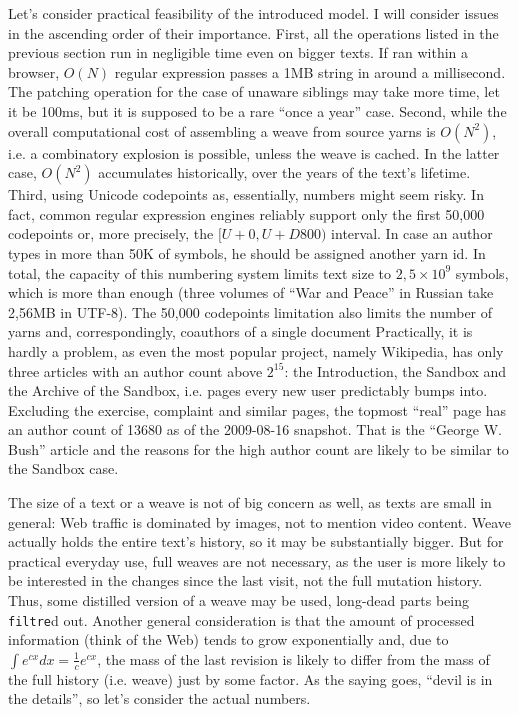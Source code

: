 \documentclass{acm_proc_article-sp}
\begin{document}
Let's consider practical feasibility of the introduced model.
I will consider issues in the ascending order of their
importance. First, all the operations
listed in the previous section run in negligible time
even on bigger texts. If ran within a browser, $O(N)$
regular expression passes a 1MB string in around a millisecond.
The patching operation for the case of unaware siblings may
take more time, let it be 100ms, but it is supposed to be a rare
``once a year'' case.
Second, while the overall computational cost of assembling a weave
from source yarns is $O(N^{2})$, i.e. a combinatory
explosion is possible, unless the weave is cached. In the
latter case, $O(N^{2})$ accumulates historically, over the
years of the text's lifetime. 
Third, using Unicode codepoints as, essentially, numbers
might seem risky. In fact, common regular expression engines
reliably support only the first 50,000 codepoints or, more
precisely, the $[U+0,U+D800)$ interval. In case an author
types in more than 50K of symbols, he should be assigned
another yarn id. In total, the capacity of this numbering
system limits text size to $2,5\times10^9$ symbols, which is more
than enough (three volumes of ``War and Peace'' in Russian
take 2,56MB in UTF-8). 
The 50,000 codepoints limitation also limits the number of yarns
and, correspondingly, coauthors of a single document
Practically, it is hardly a problem, as even the most popular
project, namely Wikipedia, has only three articles with an author
count above $2^{15}$: the Introduction, the Sandbox and the
Archive of the Sandbox, i.e. pages every new user predictably
bumps into. Excluding the exercise, complaint and similar pages,
the topmost ``real'' page has an author count of 13680 as of
the 2009-08-16 snapshot. That is the ``George W. Bush'' article
and the reasons for the high author count are likely to be
similar to the Sandbox case.


The size of a text or a weave is not of big concern as well,
as texts are small in general: Web traffic 
is dominated by images, not to mention video content.
Weave actually holds the entire text's history, so it may
be substantially bigger. But for practical everyday use,
full weaves are
not necessary, as the user is more likely to be interested
in the changes since the last visit, not the full mutation
history. Thus, some distilled version of a weave may be
used, long-dead parts being {\tt filtre}d out. Another general
consideration is that the amount of processed information
(think of the Web) tends to grow exponentially and, due to
$\int e^{cx}dx = \frac{1}{c} e^{cx}$, the mass of the last
revision is likely to differ from the mass of the full
history (i.e. weave) just by some factor. As the saying
goes, ``devil is in the details'', so let's consider the
actual numbers.
\end{document}
